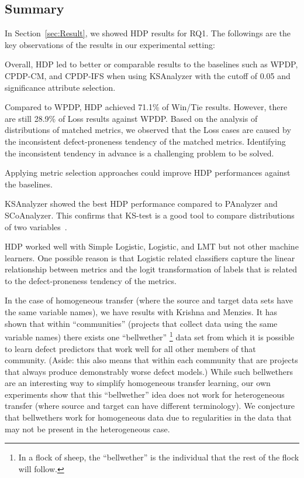 \subsection{Summary}
In Section~\ref{sec:Result}, we showed HDP results for RQ1. The followings are the key observations of the results in our experimental setting:
\squishlist
    \item Overall, HDP led to better or comparable results to the baselines such as WPDP, CPDP-CM, and CPDP-IFS when using KSAnalyzer with the cutoff of 0.05 and significance attribute selection.
    \item Compared to WPDP, HDP achieved 71.1\% of Win/Tie results. However, there are still 28.9\% of Loss results against WPDP. Based on the analysis of distributions of matched metrics, we observed that the Loss cases are caused by the inconsistent defect-proneness tendency of the matched metrics. Identifying the inconsistent tendency in advance is a challenging problem to be solved. 
    \item Applying metric selection approaches could improve HDP performances against the baselines.
    \item KSAnalyzer showed the best HDP performance compared to PAnalyzer and SCoAnalyzer. This confirms that KS-test is a good tool to compare distributions of two variables~\cite{Lilliefors67,Massey51}.
    \item HDP worked well with Simple Logistic, Logistic, and LMT but not other machine learners. One possible reason is that Logistic related classifiers capture the linear relationship between metrics and the logit transformation of labels that is related to the defect-proneness tendency of the metrics.
\squishend

In the case of homogeneous transfer (where the source and target data sets have the same variable names), we have results with Krishna and Menzies\cite{krishna2016too}. It has shown that within ``communities'' (projects that collect data using the same variable names) there exists one ``bellwether'' \footnote{In a flock of sheep, the ``bellwether'' is the individual that the rest of the flock will follow.} data set from which it is possible to learn defect predictors that work well for all other members of that community. (Aside: this also means that within each community that are projects that always produce demonstrably worse defect models.) While such bellwethers are an interesting way to simplify homogeneous transfer learning, our own experiments show that this ``bellwether'' idea does not work for heterogeneous transfer (where source and target can have different terminology). We conjecture that bellwethers work for homogeneous data due to regularities in the data that may not be present in the heterogeneous case. 

